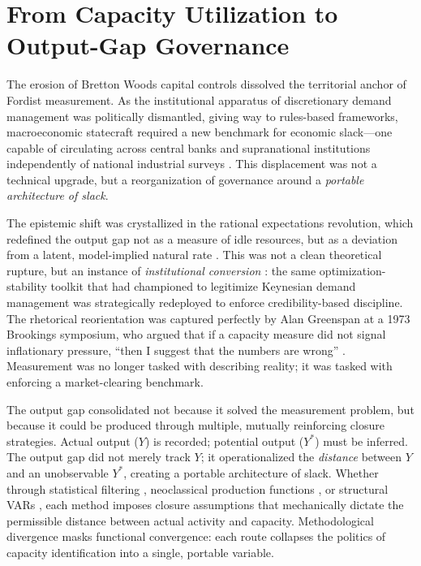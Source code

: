 \section{From Capacity Utilization to Output-Gap Governance}

The erosion of Bretton Woods capital controls dissolved the territorial anchor of Fordist measurement. As the institutional apparatus of discretionary demand management was politically dismantled, giving way to rules-based frameworks, macroeconomic statecraft required a new benchmark for economic slack---one capable of circulating across central banks and supranational institutions independently of national industrial surveys \citep{Jessop2002; Jessop2003; Konings2007}. This displacement was not a technical upgrade, but a reorganization of governance around a \textit{portable architecture of slack}. 

The epistemic shift was crystallized in the rational expectations revolution, which redefined the output gap not as a measure of idle resources, but as a deviation from a latent, model-implied natural rate \citep{Johnson2024}. This was not a clean theoretical rupture, but an instance of \textit{institutional conversion} \citep{MahoneyThelen2009}: the same optimization-stability toolkit that \citet{Samuelson1947} had championed to legitimize Keynesian demand management was strategically redeployed to enforce credibility-based discipline. The rhetorical reorientation was captured perfectly by Alan Greenspan at a 1973 Brookings symposium, who argued that if a capacity measure did not signal inflationary pressure, ``then I suggest that the numbers are wrong'' \citep[p.~758]{KleinEtAl1973}. Measurement was no longer tasked with describing reality; it was tasked with enforcing a market-clearing benchmark.

The output gap consolidated not because it solved the measurement problem, but because it could be produced through multiple, mutually reinforcing closure strategies. Actual output ($Y$) is recorded; potential output ($Y^*$) must be inferred. The output gap did not merely track $Y$; it operationalized the \textit{distance} between $Y$ and an unobservable $Y^*$, creating a portable architecture of slack. Whether through statistical filtering \citep{HodrickPrescott1997}, neoclassical production functions \citep{CBO2004PotentialGDP}, or structural VARs \citep{BlanchardQuah1989}, each method imposes closure assumptions that mechanically dictate the permissible distance between actual activity and capacity. Methodological divergence masks functional convergence: each route collapses the politics of capacity identification into a single, portable variable.

